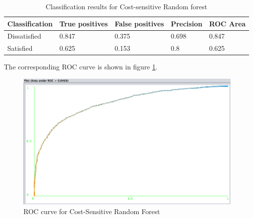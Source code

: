 \begin{table}[]
	\centering
	\begin{tabular}{|l|l|l|l|l|}
		\hline
		\textbf{Classification} & \textbf{True positives} & \textbf{False positives} & \textbf{Precision} & \textbf{ROC Area} \\ \hline
		Dissatisfied            & 0.847                   & 0.375                    & 0.698              & 0.847             \\ \hline
		Satisfied               & 0.625                   & 0.153                    & 0.8                & 0.625             \\ \hline
	\end{tabular}
 	\caption{Classification results for Cost-sensitive Random forest}
 	\label{tab:classificationResults}
 \end{table}

The corresponding ROC curve is shown in figure \ref{fig:rocCurve}. 

\begin{figure}
	\centering
	\includegraphics[width=1.0\textwidth]{img/rocResult.png}
	\caption{ROC curve for Cost-Sensitive Random Forest}
	\label{fig:rocCurve}
\end{figure}



